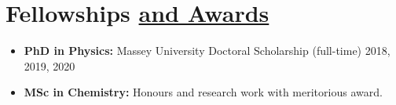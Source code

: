 \section{Fellowships \href{.}{and Awards}}

\begin{itemize}
    \itemsep-1mm
    \item {\bf PhD in Physics:} Massey University Doctoral Scholarship (full-time)
          2018, 2019, 2020
    \item {\bf MSc in Chemistry:} Honours and research work with
          meritorious award.
\end{itemize}
